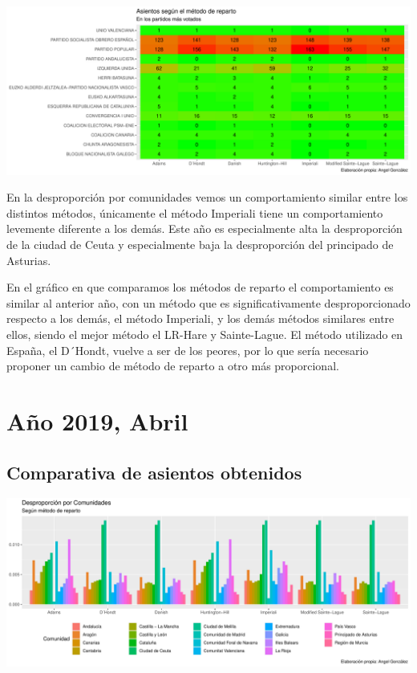\documentclass[12pt,a4paper,]{book}
\numberwithin{dummy}{section}
\theoremstyle{ocrenumbox}
\theoremstyle{blacknumex}
\theoremstyle{blacknumbox}
\theoremstyle{ocrenum}
\theoremstyle{ocrenum}
\begin{document}
\begin{center}\includegraphics[width=1\linewidth]{figurasR/unnamed-chunk-115-2} \end{center}

En la desproporción por comunidades vemos un comportamiento similar
entre los distintos métodos, únicamente el método Imperiali tiene un
comportamiento levemente diferente a los demás. Este año es
especialmente alta la desproporción de la ciudad de Ceuta y
especialmente baja la desproporción del principado de Asturias.

En el gráfico en que comparamos los métodos de reparto el comportamiento
es similar al anterior año, con un método que es significativamente
desproporcionado respecto a los demás, el método Imperiali, y los demás
métodos similares entre ellos, siendo el mejor método el LR-Hare y
Sainte-Lague. El método utilizado en España, el D´Hondt, vuelve a ser de
los peores, por lo que sería necesario proponer un cambio de método de
reparto a otro más proporcional.

\hypertarget{auxf1o-2019-abril}{%
\section{Año 2019, Abril}\label{auxf1o-2019-abril}}

\hypertarget{comparativa-de-asientos-obtenidos-13}{%
\subsection{Comparativa de asientos
obtenidos}\label{comparativa-de-asientos-obtenidos-13}}

\begin{center}\includegraphics[width=1\linewidth]{figurasR/unnamed-chunk-117-1} \end{center}
\end{document}
